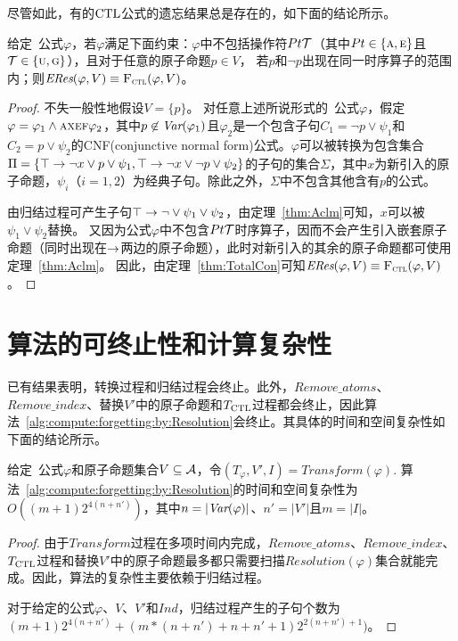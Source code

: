 尽管如此，有的$\textrm{CTL}$公式的遗忘结果总是存在的，如下面的结论所示。
\begin{proposition} \label{pro:fogCTL}
给定\CTL\ 公式$\varphi$，若$\varphi$满足下面约束：$\varphi$中不包括操作符$Pt {\cal T}$（其中$Pt \in \{\textsc{a}, \textsc{e}\}$且${\cal T} \in \{\textsc{u}, \textsc{g}\}$），且对于任意的原子命题$p\in V$， 若$p$和$\neg p$出现在同一时序算子的范围内；则$\emph{ERes}(\varphi,V) \equiv {\textsc{F}_{\textsc{ctl}}}(\varphi, V)$。
\end{proposition}
\begin{proof}
	不失一般性地假设$V = \{p\}$。
	对任意上述所说形式的\CTL\ 公式$\varphi$，假定$\varphi = \varphi_1 \wedge \textsc{a} \textsc{x} \textsc{e} \textsc{f} \varphi_2$，其中$p\not \in \textit{Var}(\varphi_1)$且$\varphi_2$是一个包含子句$C_1 = \neg p \vee \psi_1$和$C_2 = p \vee \psi_2$的CNF(conjunctive normal form)公式。$\varphi$可以被转换为包含集合$\Pi = \{\top \rightarrow \neg x \vee p \vee  \psi_1,  \top \rightarrow \neg x \vee \neg p \vee \psi_2\}$的子句的集合$\Sigma$，其中$x$为新引入的原子命题，$\psi_i$（$i=1,2$）为经典子句。除此之外，$\Sigma$中不包含其他含有$p$的公式。
	
	由归结过程可产生子句$\top \rightarrow \neg \vee \psi_1 \vee \psi_2$，由定理~\ref{thm:Aclm}可知，$x$可以被$\psi_1 \vee \psi_2$替换。
	又因为公式$\varphi$中不包含$Pt {\cal T}$时序算子，因而不会产生引入嵌套原子命题（同时出现在$\rightarrow$两边的原子命题），此时对新引入的其余的原子命题都可使用定理~\ref{thm:Aclm}。
	因此，由定理~\ref{thm:TotalCon}可知$\emph{ERes}(\varphi,V) \equiv {\textsc{F}_{\textsc{ctl}}}(\varphi, V)$。
\end{proof}



\section{算法的可终止性和计算复杂性}
\label{chp4:sect:complex}
已有结果表明，转换过程和归结过程会终止\cite{zhang2014resolution}。此外，$Remove\_atoms$、$Remove\_index$、替换$V'$中的原子命题和$T_{\textrm{CTL}}$过程都会终止，因此算法~\ref{alg:compute:forgetting:by:Resolution}会终止。其具体的时间和空间复杂性如下面的结论所示。


\begin{proposition}\label{pro:complexity}
	给定\CTL\ 公式$\varphi$和原子命题集合$V \subseteq {\cal A}$，令$(T_{\varphi}, V', I)=Transform(\varphi)$.
	算法~\ref{alg:compute:forgetting:by:Resolution}的时间和空间复杂性为$O((m+1)2^{4(n+n')})$，其中$n=|\textit{Var}(\varphi)|$、$n'=|V'|$且$m=|I|$。
\end{proposition}
\begin{proof}
	由于$Transform$过程在多项时间内完成，$Remove\_atoms$、$Remove\_index$、$T_{\textrm{CTL}}$过程和替换$V'$中的原子命题最多都只需要扫描$Resolution(\varphi)$集合就能完成。因此，算法的复杂性主要依赖于归结过程。
	
	对于给定的公式$\varphi$、$V$、$V'$和$Ind$，归结过程产生的子句个数为$(m+1)2^{4(n+n')}+(m*(n+n')+n+n'+1)2^{2(n+n')+1})$。
\end{proof}

